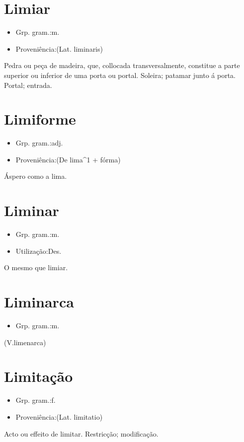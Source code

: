 \section{Limiar}
\begin{itemize}
\item {Grp. gram.:m.}
\end{itemize}
\begin{itemize}
\item {Proveniência:(Lat. \textunderscore liminaris\textunderscore )}
\end{itemize}
Pedra ou peça de madeira, que, collocada transversalmente, constitue a parte superior ou inferior de uma porta ou portal.
Soleira; patamar junto á porta.
Portal; entrada.
\section{Limiforme}
\begin{itemize}
\item {Grp. gram.:adj.}
\end{itemize}
\begin{itemize}
\item {Proveniência:(De \textunderscore lima\textunderscore ^1 + \textunderscore fórma\textunderscore )}
\end{itemize}
Áspero como a lima.
\section{Liminar}
\begin{itemize}
\item {Grp. gram.:m.}
\end{itemize}
\begin{itemize}
\item {Utilização:Des.}
\end{itemize}
O mesmo que \textunderscore limiar\textunderscore .
\section{Liminarca}
\begin{itemize}
\item {Grp. gram.:m.}
\end{itemize}
(V.limenarca)
\section{Limitação}
\begin{itemize}
\item {Grp. gram.:f.}
\end{itemize}
\begin{itemize}
\item {Proveniência:(Lat. \textunderscore limitatio\textunderscore )}
\end{itemize}
Acto ou effeito de limitar.
Restricção; modificação.
